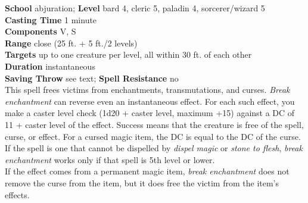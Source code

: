 \textbf{School} abjuration; \textbf{Level} bard 4, cleric 5, paladin 4, sorcerer/wizard 5\\
\textbf{Casting Time} 1 minute\\
\textbf{Components} V, S\\
\textbf{Range} close (25 ft. + 5 ft./2 levels)\\
\textbf{Targets} up to one creature per level, all within 30 ft. of each other\\
\textbf{Duration} instantaneous\\
\textbf{Saving Throw} see text; \textbf{Spell Resistance} no\\
This spell frees victims from enchantments, transmutations, and curses. \textit{Break enchantment }can reverse even an instantaneous effect. For each such effect, you make a caster level check (1d20 + caster level, maximum +15) against a DC of 11 + caster level of the effect. Success means that the creature is free of the spell, curse, or effect. For a cursed magic item, the DC is equal to the DC of the curse.\\
If the spell is one that cannot be dispelled by \textit{dispel magic} or \textit{stone to flesh}, \textit{break enchantment }works only if that spell is 5th level or lower. \\
If the effect comes from a permanent magic item, \textit{break enchantment }does not remove the curse from the item, but it does free the victim from the item's effects. \\
